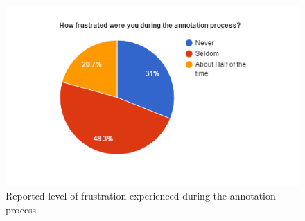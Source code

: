 \begin{figure}[]
  \includegraphics[width=\linewidth]{figures/experiment1/ex1-frustration.PNG}
  \caption{Reported level of frustration experienced during the annotation process}
  \label{fig:ex1-frustration}
\end{figure}

